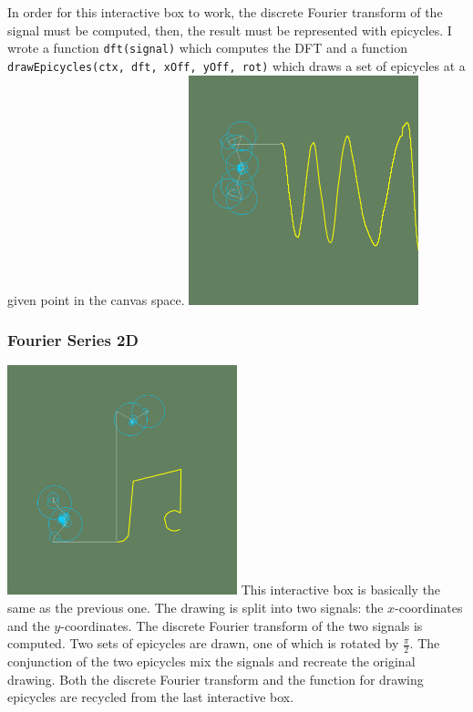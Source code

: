 \documentclass{article}
\begin{document}
\begin{multicols}{2}
    In order for this interactive box to work, the discrete Fourier transform
    of the signal must be computed, then, the result must be represented with epicycles.
    I wrote a function \texttt{dft(signal)} which computes the DFT and a function
    \texttt{drawEpicycles(ctx, dft, xOff, yOff, rot)} which draws a set of epicycles at a
    given point in the canvas space.
    \includegraphics[width=0.5\textwidth]{fourierseries1d.png}
\end{multicols}

\subsubsection{Fourier Series 2D}

\begin{multicols}{2}
    \includegraphics[width=0.5\textwidth]{fourierseries2d.png}
    This interactive box is basically the same as the previous one.
    The drawing is split into two signals: the \(x\)-coordinates and the \(y\)-coordinates.
    The discrete Fourier transform of the two signals is computed.
    Two sets of epicycles are drawn, one of which is rotated by \(\frac{\pi}{2}\).
    The conjunction of the two epicycles mix the signals and recreate the original drawing.
    Both the discrete Fourier transform and the function for drawing
    epicycles are recycled from the last interactive box.
\end{multicols}
\end{document}

